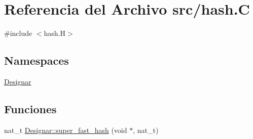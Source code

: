 \hypertarget{hash_8_c}{}\section{Referencia del Archivo src/hash.C}
\label{hash_8_c}
{\ttfamily \#include $<$hash.\+H$>$}\newline
\subsection*{Namespaces}
\begin{DoxyCompactItemize}
\item 
 \hyperlink{namespace_designar}{Designar}
\end{DoxyCompactItemize}
\subsection*{Funciones}
\begin{DoxyCompactItemize}
\item 
nat\+\_\+t \hyperlink{namespace_designar_afd5712d16b3ae1c1c7d59f1004cd96fd}{Designar\+::super\+\_\+fast\+\_\+hash} (void $\ast$, nat\+\_\+t)
\end{DoxyCompactItemize}
